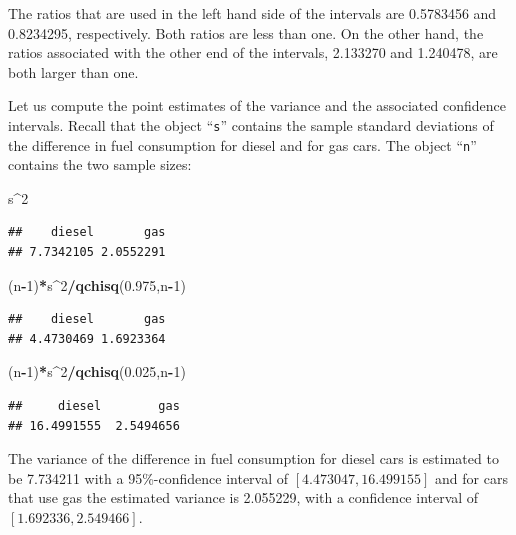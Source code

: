 \documentclass[]{krantz}
\makeatletter
\newenvironment{Shaded}{\begin{snugshade}}{\end{snugshade}}
\newcommand{\KeywordTok}[1]{\textcolor[rgb]{0.13,0.29,0.53}{\textbf{#1}}}
\newcommand{\DecValTok}[1]{\textcolor[rgb]{0.00,0.00,0.81}{#1}}
\newcommand{\FloatTok}[1]{\textcolor[rgb]{0.00,0.00,0.81}{#1}}
\newcommand{\OperatorTok}[1]{\textcolor[rgb]{0.81,0.36,0.00}{\textbf{#1}}}
\newcommand{\NormalTok}[1]{#1}
\newenvironment{kframe}{%
\medskip{}
\setlength{\fboxsep}{.8em}
 \def\at@end@of@kframe{}%
 \ifinner\ifhmode%
  \def\at@end@of@kframe{\end{minipage}}%
  \begin{minipage}{\columnwidth}%
 \fi\fi%
 \def\FrameCommand##1{\hskip\@totalleftmargin \hskip-\fboxsep
 \colorbox{shadecolor}{##1}\hskip-\fboxsep
     \hskip-\linewidth \hskip-\@totalleftmargin \hskip\columnwidth}%
 \MakeFramed {\advance\hsize-\width
   \@totalleftmargin\z@ \linewidth\hsize
   \@setminipage}}%
 {\par\unskip\endMakeFramed%
 \at@end@of@kframe}
\renewenvironment{Shaded}{\begin{kframe}}{\end{kframe}}
\theoremstyle{definition}
\theoremstyle{definition}
\theoremstyle{definition}
\theoremstyle{remark}
\makeatother
\begin{document}
The ratios that are used in the left hand side of the intervals are
0.5783456 and 0.8234295, respectively. Both ratios are less than one. On
the other hand, the ratios associated with the other end of the
intervals, 2.133270 and 1.240478, are both larger than one.

Let us compute the point estimates of the variance and the associated
confidence intervals. Recall that the object ``\texttt{s}'' contains the
sample standard deviations of the difference in fuel consumption for
diesel and for gas cars. The object ``\texttt{n}'' contains the two
sample sizes:

\begin{Shaded}
\begin{Highlighting}[]
\NormalTok{s}\OperatorTok{^}\DecValTok{2}
\end{Highlighting}
\end{Shaded}

\begin{verbatim}
##    diesel       gas 
## 7.7342105 2.0552291
\end{verbatim}

\begin{Shaded}
\begin{Highlighting}[]
\NormalTok{(n}\OperatorTok{-}\DecValTok{1}\NormalTok{)}\OperatorTok{*}\NormalTok{s}\OperatorTok{^}\DecValTok{2}\OperatorTok{/}\KeywordTok{qchisq}\NormalTok{(}\FloatTok{0.975}\NormalTok{,n}\OperatorTok{-}\DecValTok{1}\NormalTok{)}
\end{Highlighting}
\end{Shaded}

\begin{verbatim}
##    diesel       gas 
## 4.4730469 1.6923364
\end{verbatim}

\begin{Shaded}
\begin{Highlighting}[]
\NormalTok{(n}\OperatorTok{-}\DecValTok{1}\NormalTok{)}\OperatorTok{*}\NormalTok{s}\OperatorTok{^}\DecValTok{2}\OperatorTok{/}\KeywordTok{qchisq}\NormalTok{(}\FloatTok{0.025}\NormalTok{,n}\OperatorTok{-}\DecValTok{1}\NormalTok{)}
\end{Highlighting}
\end{Shaded}

\begin{verbatim}
##     diesel        gas 
## 16.4991555  2.5494656
\end{verbatim}

The variance of the difference in fuel consumption for diesel cars is
estimated to be 7.734211 with a 95\%-confidence interval of
\([4.473047, 16.499155]\) and for cars that use gas the estimated
variance is 2.055229, with a confidence interval of
\([1.692336, 2.549466]\).
\end{document}
